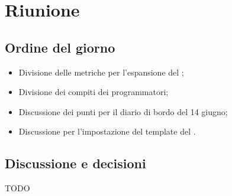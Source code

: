 \section{Riunione}
\subsection{Ordine del giorno}
\begin{itemize}
	\item Divisione delle metriche per l'espansione del \PdQ;
	\item Divisione dei compiti dei programmatori;
	\item Discussione dei punti per il diario di bordo del 14 giugno;
	\item Discussione per l'impostazione del template del .
\end{itemize}

\subsection{Discussione e decisioni}
TODO 
